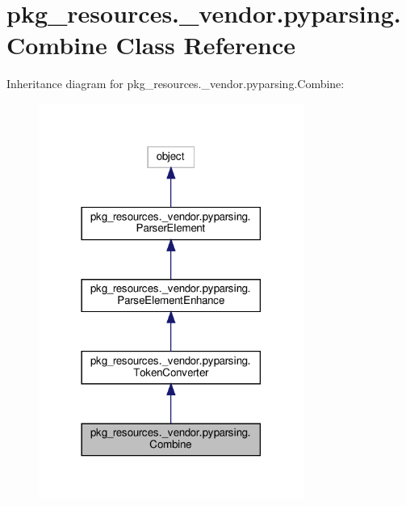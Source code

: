 \hypertarget{classpkg__resources_1_1__vendor_1_1pyparsing_1_1Combine}{}\section{pkg\+\_\+resources.\+\_\+vendor.\+pyparsing.\+Combine Class Reference}
\label{classpkg__resources_1_1__vendor_1_1pyparsing_1_1Combine}


Inheritance diagram for pkg\+\_\+resources.\+\_\+vendor.\+pyparsing.\+Combine\+:
\nopagebreak
\begin{figure}[H]
\begin{center}
\leavevmode
\includegraphics[width=246pt]{classpkg__resources_1_1__vendor_1_1pyparsing_1_1Combine__inherit__graph}
\end{center}
\end{figure}



